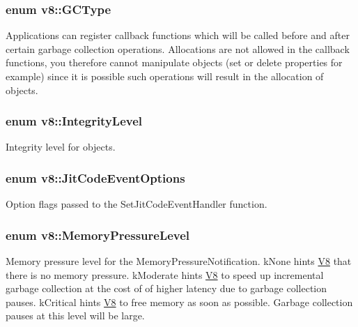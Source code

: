 \subsubsection[{\texorpdfstring{G\+C\+Type}{GCType}}]{\setlength{\rightskip}{0pt plus 5cm}enum {\bf v8\+::\+G\+C\+Type}}\hypertarget{namespacev8_ac109d6f27e0c0f9ef4e98bcf7a806cf2}{}\label{namespacev8_ac109d6f27e0c0f9ef4e98bcf7a806cf2}
Applications can register callback functions which will be called before and after certain garbage collection operations. Allocations are not allowed in the callback functions, you therefore cannot manipulate objects (set or delete properties for example) since it is possible such operations will result in the allocation of objects. 
\subsubsection[{\texorpdfstring{Integrity\+Level}{IntegrityLevel}}]{\setlength{\rightskip}{0pt plus 5cm}enum {\bf v8\+::\+Integrity\+Level}\hspace{0.3cm}{\ttfamily [strong]}}\hypertarget{namespacev8_a02642d03ff1eecc2fd358626499c2e30}{}\label{namespacev8_a02642d03ff1eecc2fd358626499c2e30}
Integrity level for objects. 
\subsubsection[{\texorpdfstring{Jit\+Code\+Event\+Options}{JitCodeEventOptions}}]{\setlength{\rightskip}{0pt plus 5cm}enum {\bf v8\+::\+Jit\+Code\+Event\+Options}}\hypertarget{namespacev8_a06f34fa4fa4cfc8518366808d1d461c1}{}\label{namespacev8_a06f34fa4fa4cfc8518366808d1d461c1}
Option flags passed to the Set\+Jit\+Code\+Event\+Handler function. 
\subsubsection[{\texorpdfstring{Memory\+Pressure\+Level}{MemoryPressureLevel}}]{\setlength{\rightskip}{0pt plus 5cm}enum {\bf v8\+::\+Memory\+Pressure\+Level}\hspace{0.3cm}{\ttfamily [strong]}}\hypertarget{namespacev8_ae0e9a25bf51e518585f555806e7dc7b9}{}\label{namespacev8_ae0e9a25bf51e518585f555806e7dc7b9}
Memory pressure level for the Memory\+Pressure\+Notification. k\+None hints \hyperlink{classv8_1_1V8}{V8} that there is no memory pressure. k\+Moderate hints \hyperlink{classv8_1_1V8}{V8} to speed up incremental garbage collection at the cost of of higher latency due to garbage collection pauses. k\+Critical hints \hyperlink{classv8_1_1V8}{V8} to free memory as soon as possible. Garbage collection pauses at this level will be large. 

